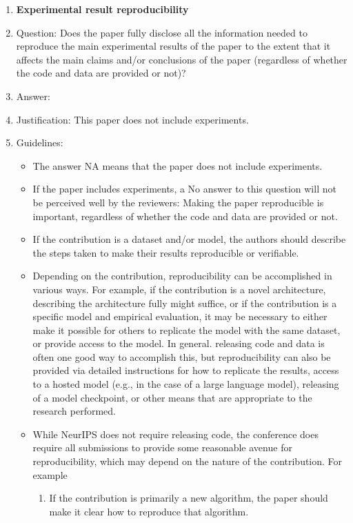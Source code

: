 \documentclass{article}
\begin{document}
\begin{enumerate}
    \item {\bf Experimental result reproducibility}
    \item[] Question: Does the paper fully disclose all the information needed to reproduce the main experimental results of the paper to the extent that it affects the main claims and/or conclusions of the paper (regardless of whether the code and data are provided or not)?
    \item[] Answer: \answerNA{} %
    \item[] Justification: This paper does not include experiments.
    \item[] Guidelines:
    \begin{itemize}
        \item The answer NA means that the paper does not include experiments.
        \item If the paper includes experiments, a No answer to this question will not be perceived well by the reviewers: Making the paper reproducible is important, regardless of whether the code and data are provided or not.
        \item If the contribution is a dataset and/or model, the authors should describe the steps taken to make their results reproducible or verifiable. 
        \item Depending on the contribution, reproducibility can be accomplished in various ways. For example, if the contribution is a novel architecture, describing the architecture fully might suffice, or if the contribution is a specific model and empirical evaluation, it may be necessary to either make it possible for others to replicate the model with the same dataset, or provide access to the model. In general. releasing code and data is often one good way to accomplish this, but reproducibility can also be provided via detailed instructions for how to replicate the results, access to a hosted model (e.g., in the case of a large language model), releasing of a model checkpoint, or other means that are appropriate to the research performed.
        \item While NeurIPS does not require releasing code, the conference does require all submissions to provide some reasonable avenue for reproducibility, which may depend on the nature of the contribution. For example
        \begin{enumerate}
            \item If the contribution is primarily a new algorithm, the paper should make it clear how to reproduce that algorithm.

\end{enumerate}
\end{itemize}
\end{enumerate}
\end{document}
